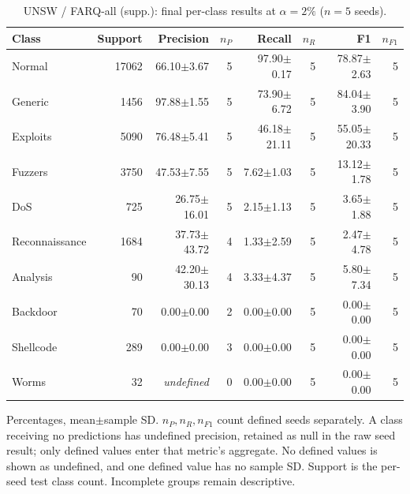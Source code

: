 \begin{table}[t]
\centering\scriptsize
\setlength{\tabcolsep}{3.3pt}
\caption{UNSW / FARQ-all (supp.): final per-class results at $\alpha=2\%$ ($n=5$ seeds).}\label{tab:forgetting-class-unsw_nb15-farq-all}
\begin{tabular}{lrrrrrrr}
\toprule
Class & Support & Precision & $n_P$ & Recall & $n_R$ & F1 & $n_{F1}$ \\
\midrule
Normal & 17062 & 66.10$\pm$3.67 & 5 & 97.90$\pm$0.17 & 5 & 78.87$\pm$2.63 & 5 \\
Generic & 1456 & 97.88$\pm$1.55 & 5 & 73.90$\pm$6.72 & 5 & 84.04$\pm$3.90 & 5 \\
Exploits & 5090 & 76.48$\pm$5.41 & 5 & 46.18$\pm$21.11 & 5 & 55.05$\pm$20.33 & 5 \\
Fuzzers & 3750 & 47.53$\pm$7.55 & 5 & 7.62$\pm$1.03 & 5 & 13.12$\pm$1.78 & 5 \\
DoS & 725 & 26.75$\pm$16.01 & 5 & 2.15$\pm$1.13 & 5 & 3.65$\pm$1.88 & 5 \\
Reconnaissance & 1684 & 37.73$\pm$43.72 & 4 & 1.33$\pm$2.59 & 5 & 2.47$\pm$4.78 & 5 \\
Analysis & 90 & 42.20$\pm$30.13 & 4 & 3.33$\pm$4.37 & 5 & 5.80$\pm$7.34 & 5 \\
Backdoor & 70 & 0.00$\pm$0.00 & 2 & 0.00$\pm$0.00 & 5 & 0.00$\pm$0.00 & 5 \\
Shellcode & 289 & 0.00$\pm$0.00 & 3 & 0.00$\pm$0.00 & 5 & 0.00$\pm$0.00 & 5 \\
Worms & 32 & \textit{undefined} & 0 & 0.00$\pm$0.00 & 5 & 0.00$\pm$0.00 & 5 \\
\bottomrule
\end{tabular}
\par\smallskip\begin{minipage}{0.98\textwidth}\scriptsize Percentages, mean$\pm$sample SD. $n_P,n_R,n_{F1}$ count defined seeds separately. A class receiving no predictions has undefined precision, retained as null in the raw seed result; only defined values enter that metric's aggregate. No defined values is shown as undefined, and one defined value has no sample SD. Support is the per-seed test class count. Incomplete groups remain descriptive.\end{minipage}
\end{table}

